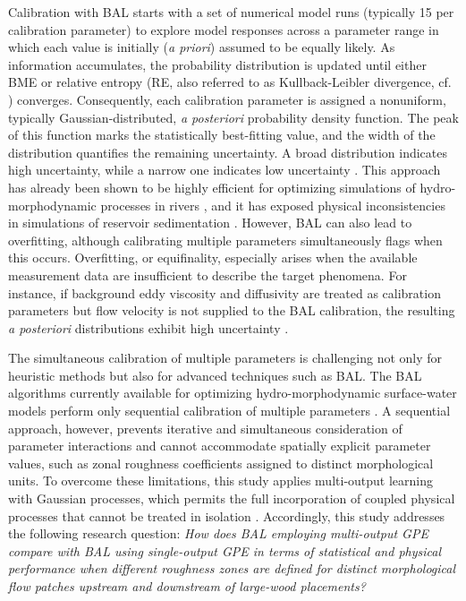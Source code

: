 \documentclass[draft,linenumbers,onecolumn]{agujournal2019} %
\begin{document}
Calibration with BAL starts with a set of numerical model runs (typically 15 per calibration parameter) to explore model responses across a parameter range in which each value is initially (\textit{a priori}) assumed to be equally likely. As information accumulates, the probability distribution is updated until either BME or relative entropy (RE, also referred to as Kullback-Leibler divergence, cf. ) converges. Consequently, each calibration parameter is assigned a nonuniform, typically Gaussian-distributed, \textit{a posteriori} probability density function. The peak of this function marks the statistically best-fitting value, and the width of the distribution quantifies the remaining uncertainty. A broad distribution indicates high uncertainty, while a narrow one indicates low uncertainty \cite{oladyshkin2020bayesian3}. This approach has already been shown to be highly efficient for optimizing simulations of hydro-morphodynamic processes in rivers \cite{beckers2020bayesian}, and it has exposed physical inconsistencies in simulations of reservoir sedimentation \cite{mouris2023stability}. However, BAL can also lead to overfitting, although calibrating multiple parameters simultaneously flags when this occurs. Overfitting, or equifinality, especially arises when the available measurement data are insufficient to describe the target phenomena. For instance, if background eddy viscosity and diffusivity are treated as calibration parameters but flow velocity is not supplied to the BAL calibration, the resulting \textit{a posteriori} distributions exhibit high uncertainty \cite{schwindt2023bayesian}.

The simultaneous calibration of multiple parameters is challenging not only for heuristic methods but also for advanced techniques such as BAL. The BAL algorithms currently available for optimizing hydro-morphodynamic surface-water models perform only sequential calibration of multiple parameters \cite{mouris2023stability,schwindt2023bayesian}. A sequential approach, however, prevents iterative and simultaneous consideration of parameter interactions and cannot accommodate spatially explicit parameter values, such as zonal roughness coefficients assigned to distinct morphological units. To overcome these limitations, this study applies multi-output learning with Gaussian processes, which permits the full incorporation of coupled physical processes that cannot be treated in isolation \cite{bonilla2007multitask}. Accordingly, this study addresses the following research question: \textit{How does BAL employing multi-output GPE compare with BAL using single-output GPE in terms of statistical and physical performance when different roughness zones are defined for distinct morphological flow patches upstream and downstream of large-wood placements?}
\end{document}
